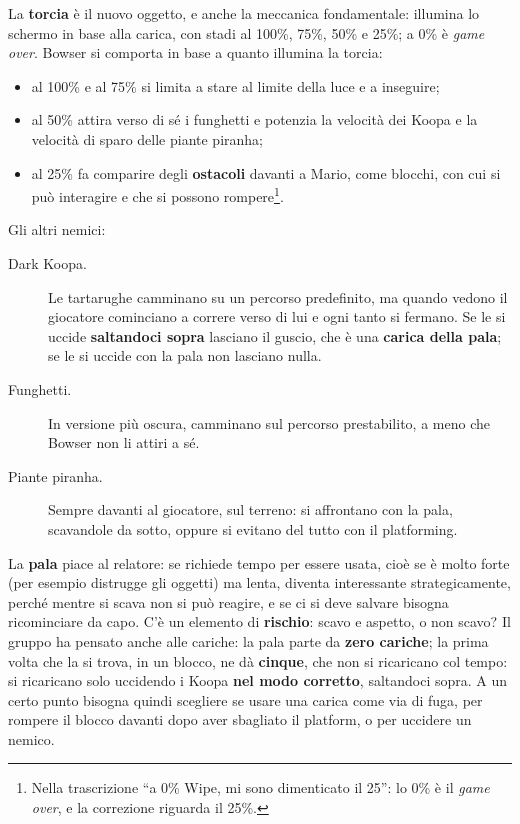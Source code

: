 La \textbf{torcia} è il nuovo oggetto, e anche la meccanica fondamentale: illumina lo
schermo in base alla carica, con stadi al 100\%, 75\%, 50\% e 25\%; a 0\% è
\emph{game over}. Bowser si comporta in base a quanto illumina la torcia:
\begin{itemize}
  \item al 100\% e al 75\% si limita a stare al limite della luce e a inseguire;
  \item al 50\% attira verso di sé i funghetti e potenzia la velocità dei Koopa
        e la velocità di sparo delle piante piranha;
  \item al 25\% fa comparire degli \textbf{ostacoli} davanti a Mario, come
        blocchi, con cui si può interagire e che si possono rompere\footnote{Nella
        trascrizione ``a 0\% Wipe, mi sono dimenticato il 25'': lo 0\% è il
        \emph{game over}, e la correzione riguarda il 25\%.}.
\end{itemize}
Gli altri nemici:
\begin{description}
  \item[Dark Koopa.] Le tartarughe camminano su un percorso predefinito, ma quando
        vedono il giocatore cominciano a correre verso di lui e ogni tanto si
        fermano. Se le si uccide \textbf{saltandoci sopra} lasciano il guscio, che è
        una \textbf{carica della pala}; se le si uccide con la pala non lasciano
        nulla.
  \item[Funghetti.] In versione più oscura, camminano sul percorso prestabilito,
        a meno che Bowser non li attiri a sé.
  \item[Piante piranha.] Sempre davanti al giocatore, sul terreno: si affrontano
        con la pala, scavandole da sotto, oppure si evitano del tutto con il
        platforming.
\end{description}

La \textbf{pala} piace al relatore: se richiede tempo per essere usata, cioè se è
molto forte (per esempio distrugge gli oggetti) ma lenta, diventa interessante
strategicamente, perché mentre si scava non si può reagire, e se ci si deve salvare
bisogna ricominciare da capo. C'è un elemento di \textbf{rischio}: scavo e aspetto, o
non scavo? Il gruppo ha pensato anche alle cariche: la pala parte da \textbf{zero
cariche}; la prima volta che la si trova, in un blocco, ne dà \textbf{cinque}, che
non si ricaricano col tempo: si ricaricano solo uccidendo i Koopa \textbf{nel modo
corretto}, saltandoci sopra. A un certo punto bisogna quindi scegliere se usare una
carica come via di fuga, per rompere il blocco davanti dopo aver sbagliato il
platform, o per uccidere un nemico.

